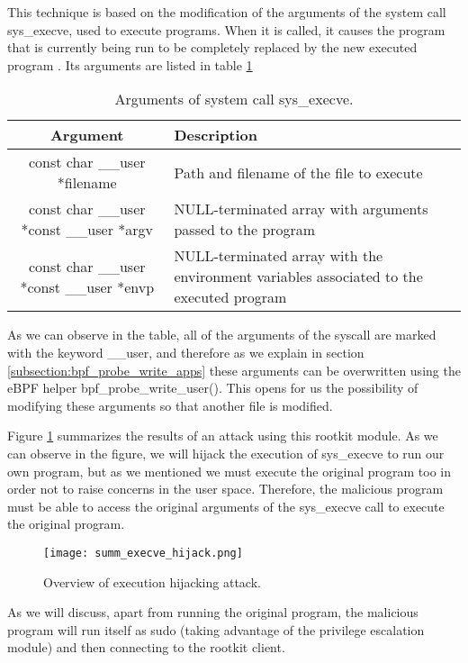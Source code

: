 This technique is based on the modification of the arguments of the system call sys\_execve, used to execute programs. When it is called, it causes the program that is currently being run to be completely replaced by the new executed program \cite{execve_man}. Its arguments are listed in table \ref{table:execve_args}

\begin{table}[htbp]
\begin{tabular}{|c|>{\centering\arraybackslash}p{7cm}|}
\hline
Argument & Description\\
\hline
\hline
const char \_\_user *filename & Path and filename of the file to execute\\
\hline
const char \_\_user *const \_\_user *argv & NULL-terminated array with arguments passed to the program\\
\hline
const char \_\_user *const \_\_user *envp & NULL-terminated array with the environment variables associated to the executed program \cite{environ}\\
\hline
\end{tabular}
\caption{Arguments of system call sys\_execve.}
\label{table:execve_args}
\end{table}

As we can observe in the table, all of the arguments of the syscall are marked with the keyword \_\_user, and therefore as we explain in section \ref{subsection:bpf_probe_write_apps} these arguments can be overwritten using the eBPF helper bpf\_probe\_write\_user(). This opens for us the possibility of modifying these arguments so that another file is modified.

Figure \ref{fig:summ_execve_hijack} summarizes the results of an attack using this rootkit module. As we can observe in the figure, we will hijack the execution of sys\_execve to run our own program, but as we mentioned we must execute the original program too in order not to raise concerns in the user space. Therefore, the malicious program must be able to access the original arguments of the sys\_execve call to execute the original program.

\begin{figure}[htbp]
	\centering
	\texttt{[image: summ\_execve\_hijack.png]}
	\caption{Overview of execution hijacking attack.}
	\label{fig:summ_execve_hijack}
\end{figure}

As we will discuss, apart from running the original program, the malicious program will run itself as sudo (taking advantage of the privilege escalation module) and then connecting to the rootkit client.


